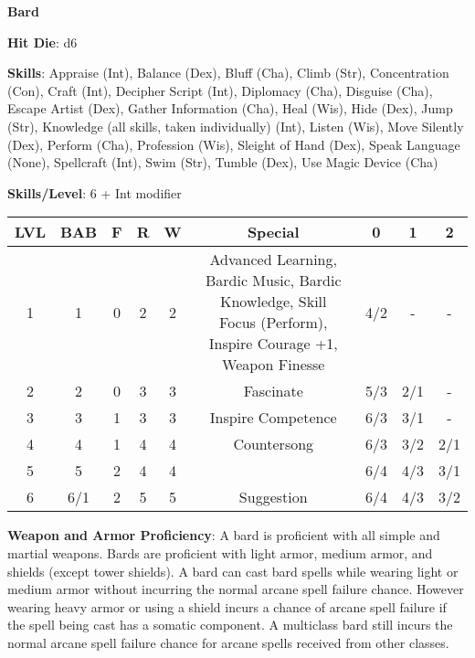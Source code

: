 \textbf{\huge{Bard}}

\textbf{Hit Die}: d6

\textbf{Skills}: Appraise (Int), Balance (Dex), Bluff (Cha), Climb (Str), Concentration (Con), Craft (Int), Decipher Script (Int), Diplomacy (Cha), Disguise (Cha), Escape Artist (Dex), Gather Information (Cha), Heal (Wis), Hide (Dex), Jump (Str), Knowledge (all skills, taken individually) (Int), Listen (Wis), Move Silently (Dex), Perform (Cha), Profession (Wis), Sleight of Hand (Dex), Speak Language (None), Spellcraft (Int), Swim (Str), Tumble (Dex), Use Magic Device (Cha)

\textbf{Skills/Level}: 6 + Int modifier

\begin{center}
\begin{adjustwidth}{-4cm}{}
\begin{small}
\begin{tabular}{| c | c | c | c | c | c | c | c | c |}
\hline
LVL &BAB &F &R &W &Special &0 &1 &2 \\
\hline
1 &1 &0 &2 &2 &\makecell{Advanced Learning, Bardic Music, Bardic Knowledge, Skill\\ Focus (Perform), Inspire Courage +1, Weapon Finesse} &4/2 &- &- \\
2 &2 &0 &3 &3 &Fascinate &5/3 &2/1 &- \\
3 &3 &1 &3 &3 &Inspire Competence &6/3 &3/1 &- \\
4 &4 &1 &4 &4 &Countersong &6/3 &3/2 &2/1 \\
5 &5 &2 &4 &4 & &6/4 &4/3 &3/1 \\
6 &6/1 &2 &5 &5 &Suggestion &6/4 &4/3 &3/2 \\
\hline
\end{tabular}
\end{small}
\end{adjustwidth}
\end{center}

\textbf{Weapon and Armor Proficiency}: A bard is proficient with all simple and martial weapons. Bards are proficient with light armor, medium armor, and shields (except tower shields). A bard can cast bard spells while wearing light or medium armor without incurring the normal arcane spell failure chance. However wearing heavy armor or using a shield incurs a chance of arcane spell failure if the spell being cast has a somatic component. A multiclass bard still incurs the normal arcane spell failure chance for arcane spells received from other classes.

